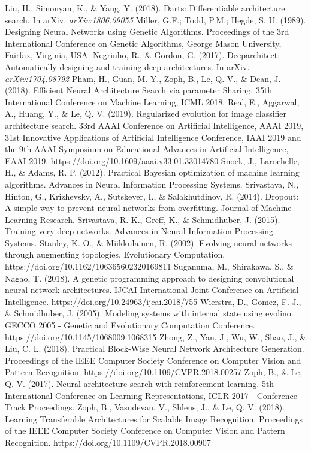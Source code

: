 \documentclass[conference]{IEEEtran}
\begin{document}
\begin{thebibliography}{00}
 Liu, H., Simonyan, K., \& Yang, Y. (2018). Darts: Differentiable architecture search. In arXiv. \textit{arXiv:1806.09055}
 Miller, G.F.; Todd, P.M.; Hegde, S. U. (1989). Designing Neural Networks using Genetic Algorithms. Proceedings of the 3rd International Conference on Genetic Algorithms, George Mason University, Fairfax, Virginia, USA.
 Negrinho, R., \& Gordon, G. (2017). Deeparchitect: Automatically designing and training deep architectures. In arXiv. \textit{arXiv:1704.08792}
 Pham, H., Guan, M. Y., Zoph, B., Le, Q. V., \& Dean, J. (2018). Efficient Neural Architecture Search via parameter Sharing. 35th International Conference on Machine Learning, ICML 2018.
 Real, E., Aggarwal, A., Huang, Y., \& Le, Q. V. (2019). Regularized evolution for image classifier architecture search. 33rd AAAI Conference on Artificial Intelligence, AAAI 2019, 31st Innovative Applications of Artificial Intelligence Conference, IAAI 2019 and the 9th AAAI Symposium on Educational Advances in Artificial Intelligence, EAAI 2019. https://doi.org/10.1609/aaai.v33i01.33014780
 Snoek, J., Larochelle, H., \& Adams, R. P. (2012). Practical Bayesian optimization of machine learning algorithms. Advances in Neural Information Processing Systems.
 Srivastava, N., Hinton, G., Krizhevsky, A., Sutskever, I., \& Salakhutdinov, R. (2014). Dropout: A simple way to prevent neural networks from overfitting. Journal of Machine Learning Research.
 Srivastava, R. K., Greff, K., \& Schmidhuber, J. (2015). Training very deep networks. Advances in Neural Information Processing Systems.
 Stanley, K. O., \& Miikkulainen, R. (2002). Evolving neural networks through augmenting topologies. Evolutionary Computation. https://doi.org/10.1162/106365602320169811
 Suganuma, M., Shirakawa, S., \& Nagao, T. (2018). A genetic programming approach to designing convolutional neural network architectures. IJCAI International Joint Conference on Artificial Intelligence. https://doi.org/10.24963/ijcai.2018/755
 Wierstra, D., Gomez, F. J., \& Schmidhuber, J. (2005). Modeling systems with internal state using evolino. GECCO 2005 - Genetic and Evolutionary Computation Conference. https://doi.org/10.1145/1068009.1068315
 Zhong, Z., Yan, J., Wu, W., Shao, J., \& Liu, C. L. (2018). Practical Block-Wise Neural Network Architecture Generation. Proceedings of the IEEE Computer Society Conference on Computer Vision and Pattern Recognition. https://doi.org/10.1109/CVPR.2018.00257
 Zoph, B., \& Le, Q. V. (2017). Neural architecture search with reinforcement learning. 5th International Conference on Learning Representations, ICLR 2017 - Conference Track Proceedings.
 Zoph, B., Vasudevan, V., Shlens, J., \& Le, Q. V. (2018). Learning Transferable Architectures for Scalable Image Recognition. Proceedings of the IEEE Computer Society Conference on Computer Vision and Pattern Recognition. https://doi.org/10.1109/CVPR.2018.00907 
\end{thebibliography}
\vspace{12pt}
\end{document}
